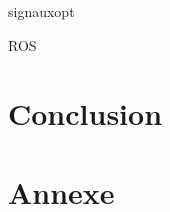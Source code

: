 \documentclass[11pt]{article}
\begin{document}
\cleardoublepage


{signauxopt}

\cleardoublepage


{ROS}

\section{Conclusion}
\cleardoublepage



\section{Annexe}


\cleardoublepage
\end{document}
